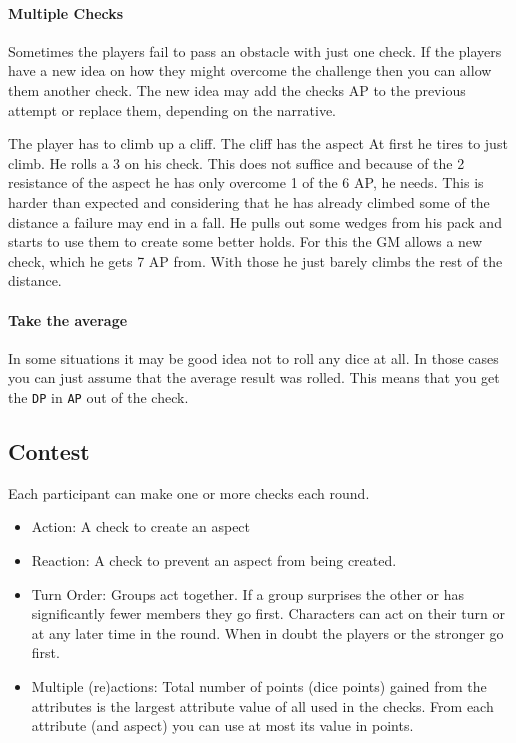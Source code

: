 \documentclass[11pt]{article}
\begin{document}
{\paragraph*{Multiple Checks}
\label{sec:org9546207}
Sometimes the players fail to pass an obstacle with just one check. If the players have a new idea on how they might overcome the challenge then you can allow them another check. The new idea may add the checks AP to the previous attempt or replace them, depending on the narrative.

\begin{pwexample}
The player has to climb up a cliff. The cliff has the aspect  At first he tires to just climb. He rolls a 3 on his check. This does not suffice and because of the 2 resistance of the aspect he has only overcome 1 of the 6 AP, he needs. This is harder than expected and considering that he has already climbed some of the distance a failure may end in a fall. He pulls out some wedges from his pack and starts to use them to create some better holds. For this the GM allows a new check, which he gets 7 AP from. With those he just barely climbs the rest of the distance.
\end{pwexample}
\paragraph*{Take the average}
\label{sec:org67312b7}
In some situations it may be good idea not to roll any dice at all. In those cases you can just assume that the average result was rolled. This means that you get the \texttt{DP} in \texttt{AP} out of the check. 
\subsection{Contest}
\label{sec:org00adb54}
\begin{short}
Each participant can make one or more checks each round.
\begin{itemize}
\item Action: A check to create an aspect
\item Reaction: A check to prevent an aspect from being created.
\item Turn Order: Groups act together. If a group surprises the other or has significantly fewer members they go first. Characters can act on their turn or at any later time in the round. When in doubt the players or the stronger go first.
\item Multiple (re)actions: Total number of points (dice points) gained from the attributes is the largest attribute value of all used in the checks. From each attribute (and aspect) you can use at most its value in points.
\end{itemize}
\end{short}

}
\end{document}
